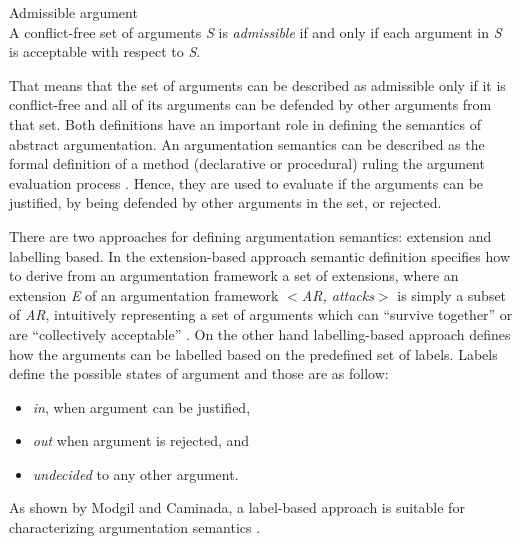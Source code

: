 \begin{definition}{Admissible argument} \label{admissibleArgument}
\label{AdmissibleArgDef}\\
A conflict-free set of arguments \textit{S} is \textit{admissible} if and only if each argument in \textit{S} is acceptable with respect to \textit{S}.
\end{definition}

That means that the set of arguments can be described as admissible only if it is conflict-free and all of its arguments can be defended by other arguments from that set. Both definitions have an important role in defining the semantics of abstract argumentation. An argumentation semantics can be described as the formal definition of a method (declarative or procedural) ruling the argument evaluation process \citep{baroni2009semantics}. Hence, they are used to evaluate if the arguments can be justified, by being defended by other arguments in the set, or rejected. 

There are two approaches for defining argumentation semantics: extension and labelling based. In the extension-based approach semantic definition specifies how to derive from an argumentation framework a set of extensions, where an extension \textit{E} of an argumentation framework $<$\textit{AR, attacks}$>$ is simply a subset of \textit{AR}, intuitively representing a set of arguments which can “survive together” or are “collectively acceptable” \citep{baroni2009semantics}. On the other hand labelling-based approach defines how the arguments can be labelled based on the predefined set of labels. Labels define the possible states of argument and those are as follow: 
\begin{itemize}
	\item \textit{in}, when argument can be justified, 
	\item \textit{out} when argument is rejected, and 
	\item \textit{undecided} to any other argument.
\end{itemize}

As shown by Modgil and Caminada, a label-based approach is suitable for characterizing argumentation semantics \citep{modgil2009proof}.